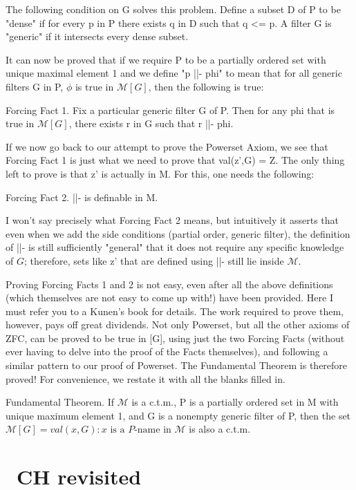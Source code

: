 \documentclass[10pt]{article}
\theoremstyle{definition}
\begin{document}
The following condition on G solves this problem.  Define a subset D of P
to be "dense" if for every p in P there exists q in D such that q <= p.
A filter G is "generic" if it intersects every dense subset.

It can now be proved that if we require P to be a partially ordered set with
unique maximal element 1 and we define "p ||- phi" to mean that for all
generic filters G in P, $\phi$ is true in $\mathcal{M}[G]$, then the following is true:

Forcing Fact 1.  Fix a particular generic filter G of P.  Then for any phi
that is true in $\mathcal{M}[G]$, there exists r in G such that r ||- phi.

If we now go back to our attempt to prove the Powerset Axiom, we see that
Forcing Fact 1 is just what we need to prove that val(z',G) = Z.  The only
thing left to prove is that z' is actually in M.  For this, one needs the
following:

Forcing Fact 2.  ||- is definable in M.

I won't say precisely what Forcing Fact 2 means, but intuitively it asserts
that even when we add the side conditions (partial order, generic filter),
the definition of ||- is still sufficiently "general" that it does not
require any specific knowledge of $G$; therefore, sets like z' that are
defined using ||- still lie inside $\mathcal{M}$.

Proving Forcing Facts 1 and 2 is not easy, even after all the above
definitions (which themselves are not easy to come up with!) have been
provided.  Here I must refer you to a Kunen's book for details.  The work
required to prove them, however, pays off great dividends.  Not only
Powerset, but all the other axioms of ZFC, can be proved to be true in [G],
using just the two Forcing Facts (without ever having to delve into the
proof of the Facts themselves), and following a similar pattern to our proof
of Powerset.  The Fundamental Theorem is therefore proved!  For convenience,
we restate it with all the blanks filled in.

Fundamental Theorem.  If $\mathcal{M}$ is a c.t.m., P is a partially ordered set in M
with unique maximum element 1, and G is a nonempty generic filter of P, then
the set $\mathcal{M}[G] = {val(x,G) : x \text{ is a }P\text{-name in }\mathcal M}$ is also a c.t.m.


\section{~CH revisited}
\end{document}
